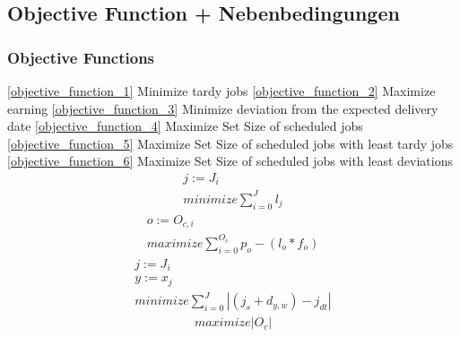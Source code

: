 \documentclass[a4paper,12pt,twoside]{scrreprt}
\begin{document}
\subsection*{Objective Function + Nebenbedingungen}
\subsubsection*{Objective Functions}
\begin{flushleft}
\autoref{objective_function_1} Minimize tardy jobs\linebreak
\autoref{objective_function_2} Maximize earning\linebreak
\autoref{objective_function_3} Minimize deviation from the expected delivery date\linebreak
\autoref{objective_function_4} Maximize Set Size of scheduled jobs\linebreak
\autoref{objective_function_5} Maximize Set Size of scheduled jobs with least tardy jobs\linebreak
\autoref{objective_function_6} Maximize Set Size of scheduled jobs with least deviations\linebreak
	\begin{equation}
	\label{objective_function_1}
	\begin{split}
		j := J_{i} \\
		minimize \sum_{i=0}^{J}l_{j} 
	\end{split}
	\end{equation}
	\begin{equation}
	\label{objective_function_2}
	\begin{split}
		o := O_{c,i} \\
		maximize \sum_{i=0}^{O_{c}}p_{o} - (l_{o} * f_{o})
	\end{split}
	\end{equation}
	\begin{equation}
	\label{objective_function_3}
	\begin{split}
		j := J_{i} \\
		y := x_{j} \\
		minimize \sum_{i=0}^{J} |(j_{s} + d_{y,w}) - j_{dt}|
	\end{split}
	\end{equation}
	\begin{equation}
	\label{objective_function_4}
	\begin{split}
		maximize |O_{c}|
	\end{split}
	\end{equation}
	\begin{equation}

\end{equation}
\end{flushleft}
\end{document}
